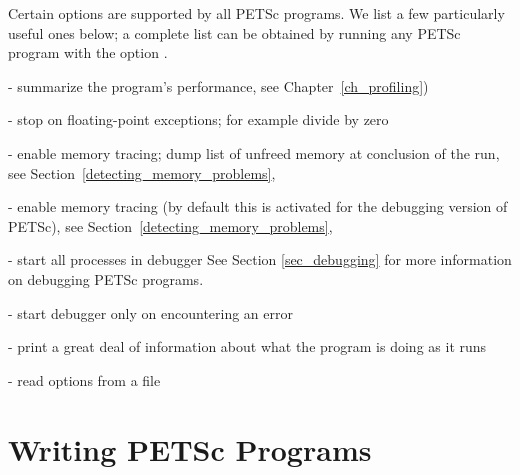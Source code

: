 Certain options are supported by all PETSc programs.  We list a few
particularly useful ones below; a complete list can be obtained by
running any PETSc program with the option .
\begin{tightitemize}
\item {} - summarize the program's performance, see Chapter~\ref{ch_profiling})
\item {} - stop on floating-point exceptions; 
      for example divide by zero
\item {} - enable memory tracing; dump list of unfreed memory
      at conclusion  of the run, see Section~\ref{detecting_memory_problems},
\item {} - enable memory tracing (by default this is
      activated for the debugging version of PETSc), see Section~\ref{detecting_memory_problems},
\item {}  
     - start all processes in debugger  
      See Section \ref{sec_debugging} for more information on debugging PETSc programs.
\item {}  
       - start debugger only on encountering an error
\item {} - print a great deal of information about what the program is doing as it runs
\item {}  - read options from a file
\end{tightitemize}




\section{Writing PETSc Programs}
\label{sec_writing}

